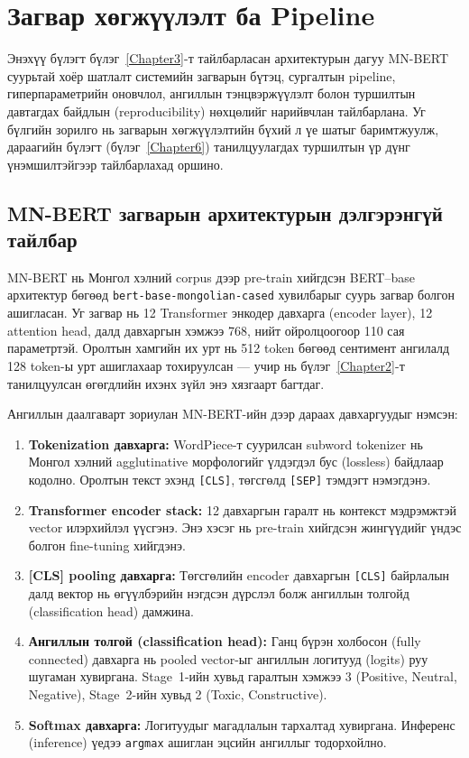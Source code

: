 
\chapter{Загвар хөгжүүлэлт ба Pipeline}
\label{Chapter5}

Энэхүү бүлэгт бүлэг~\ref{Chapter3}-т тайлбарласан архитектурын дагуу MN-BERT
суурьтай хоёр шатлалт системийн загварын бүтэц, сургалтын pipeline, гиперпараметрийн
оновчлол, ангиллын тэнцвэржүүлэлт болон туршилтын давтагдах байдлын (reproducibility)
нөхцөлийг нарийвчлан тайлбарлана. Уг бүлгийн зорилго нь загварын хөгжүүлэлтийн
бүхий л үе шатыг баримтжуулж, дараагийн бүлэгт (бүлэг~\ref{Chapter6}) танилцуулагдах
туршилтын үр дүнг үнэмшилтэйгээр тайлбарлахад оршино.

\section{MN-BERT загварын архитектурын дэлгэрэнгүй тайлбар}

MN-BERT нь Монгол хэлний corpus дээр pre-train хийгдсэн BERT--base архитектур
бөгөөд \texttt{bert-base-mongolian-cased} хувилбарыг суурь загвар болгон
ашигласан. Уг загвар нь 12 Transformer энкодер давхарга (encoder layer), 12
attention head, далд давхаргын хэмжээ 768, нийт ойролцоогоор 110 сая параметртэй.
Оролтын хамгийн их урт нь 512 token бөгөөд сентимент ангилалд 128 token-ы урт
ашиглахаар тохируулсан --- учир нь бүлэг~\ref{Chapter2}-т танилцуулсан өгөгдлийн
ихэнх зүйл энэ хязгаарт багтдаг.

Ангиллын даалгаварт зориулан MN-BERT-ийн дээр дараах давхаргуудыг нэмсэн:

\begin{enumerate}
  \item \textbf{Tokenization давхарга:} WordPiece-т суурилсан subword tokenizer
    нь Монгол хэлний agglutinative морфологийг үлдэгдэл бус (lossless) байдлаар
    кодолно. Оролтын текст эхэнд \texttt{[CLS]}, төгсгөлд \texttt{[SEP]} тэмдэгт
    нэмэгдэнэ.
  \item \textbf{Transformer encoder stack:} 12 давхаргын гаралт нь контекст мэдрэмжтэй
    vector илэрхийлэл үүсгэнэ. Энэ хэсэг нь pre-train хийгдсэн жингүүдийг үндэс
    болгон fine-tuning хийгдэнэ.
  \item \textbf{[CLS] pooling давхарга:} Төгсгөлийн encoder давхаргын
    \texttt{[CLS]} байрлалын далд вектор нь өгүүлбэрийн нэгдсэн дүрслэл болж
    ангиллын толгойд (classification head) дамжина.
  \item \textbf{Ангиллын толгой (classification head):} Ганц бүрэн холбосон
    (fully connected) давхарга нь pooled vector-ыг ангиллын логитууд (logits)
    руу шугаман хувиргана. Stage~1-ийн хувьд гаралтын хэмжээ 3 (Positive,
    Neutral, Negative), Stage~2-ийн хувьд 2 (Toxic, Constructive).
  \item \textbf{Softmax давхарга:} Логитуудыг магадлалын тархалтад хувиргана.
    Инференс (inference) үедээ \texttt{argmax} ашиглан эцсийн ангиллыг тодорхойлно.
\end{enumerate}


